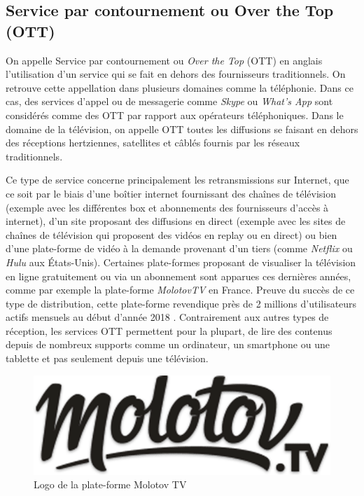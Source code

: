 \documentclass{polytech/polytech}
\begin{document}
\subsection{Service par contournement ou Over the Top (OTT)}

On appelle Service par contournement ou \textit{Over the Top} (OTT) en anglais l'utilisation d'un service qui se fait en dehors des fournisseurs traditionnels. On retrouve cette appellation dans plusieurs domaines comme la téléphonie. Dans ce cas, des services d'appel ou de messagerie comme \textit{Skype} ou \textit{What's App} sont considérés comme des OTT par rapport aux opérateurs téléphoniques. Dans le domaine de la télévision, on appelle OTT toutes les diffusions se faisant en dehors des réceptions hertziennes, satellites et câblés fournis par les réseaux traditionnels. 

Ce type de service concerne principalement les retransmissions sur Internet, que ce soit par le biais d'une boîtier internet fournissant des chaînes de télévision (exemple avec les différentes box et abonnements des fournisseurs d'accès à internet), d'un site proposant des diffusions en direct (exemple avec les sites de chaînes de télévision qui proposent des vidéos en replay ou en direct) ou bien d'une plate-forme de vidéo à la demande provenant d'un tiers (comme \textit{Netflix} ou \textit{Hulu} aux \'{E}tats-Unis). Certaines plate-formes proposant de visualiser la télévision en ligne gratuitement ou via un abonnement sont apparues ces dernières années, comme par exemple la plate-forme \textit{MolotovTV} en France. Preuve du succès de ce type de distribution, cette plate-forme revendique près de 2 millions d'utilisateurs actifs mensuels au début d'année 2018 \cite{_molotov_2018}. Contrairement aux autres types de réception, les services OTT permettent pour la plupart, de lire des contenus depuis de nombreux supports comme un ordinateur, un smartphone ou une tablette et pas seulement depuis une télévision.


\begin{figure}
	\includegraphics[scale=0.4]{images/logoMolotov}
	\caption{Logo de la plate-forme Molotov TV}
	\label{fig:logoMolotov}
\end{figure}
\end{document}

